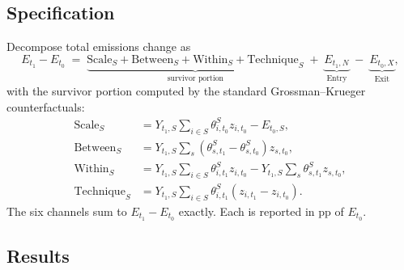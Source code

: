 \documentclass[11pt]{article}
\begin{document}
\subsection{Specification}
Decompose total emissions change as
\begin{equation}
  E_{t_1} - E_{t_0} \;=\; \underbrace{\text{Scale}_S + \text{Between}_S + \text{Within}_S + \text{Technique}_S}_{\text{survivor portion}} \;+\; \underbrace{E_{t_1, N}}_{\text{Entry}} \;-\; \underbrace{E_{t_0, X}}_{\text{Exit}},
\end{equation}
with the survivor portion computed by the standard Grossman--Krueger counterfactuals:
\begin{align*}
  \text{Scale}_S     &= Y_{t_1,S} \textstyle\sum_{i \in S} \theta_{i,t_0}^S z_{i,t_0} - E_{t_0,S}, \\
  \text{Between}_S   &= Y_{t_1,S} \textstyle\sum_{s} (\theta_{s,t_1}^S - \theta_{s,t_0}^S) z_{s,t_0}, \\
  \text{Within}_S    &= Y_{t_1,S} \textstyle\sum_{i \in S} \theta_{i,t_1}^S z_{i,t_0} - Y_{t_1,S} \sum_s \theta_{s,t_1}^S z_{s,t_0}, \\
  \text{Technique}_S &= Y_{t_1,S} \textstyle\sum_{i \in S} \theta_{i,t_1}^S (z_{i,t_1} - z_{i,t_0}).
\end{align*}
The six channels sum to $E_{t_1} - E_{t_0}$ exactly. Each is reported in pp of $E_{t_0}$.

\subsection{Results}
\end{document}
